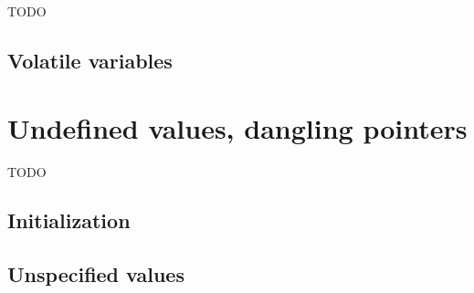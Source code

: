 TODO


\subsection{Volatile variables}\label{sec:volatile-variables}

\absent


\section{Undefined values, dangling pointers}

TODO


\subsection{Initialization}


\subsection{Unspecified values}
